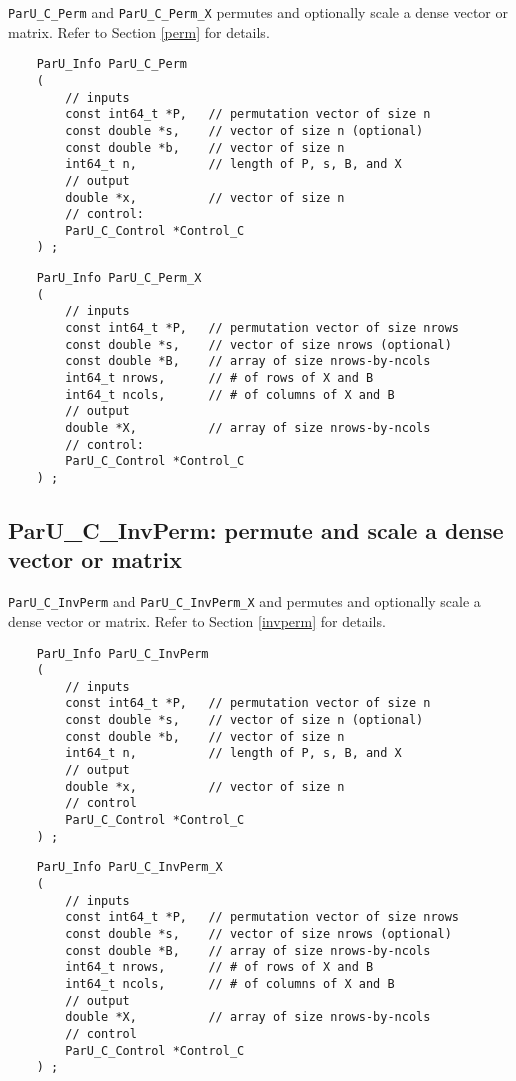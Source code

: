 \documentclass[12pt]{article}
\begin{document}
    \verb'ParU_C_Perm' and \verb'ParU_C_Perm_X' permutes and optionally scale a
    dense vector or matrix.  Refer to Section \ref{perm} for details.

    {\footnotesize
    \begin{verbatim}
    ParU_Info ParU_C_Perm
    (
        // inputs
        const int64_t *P,   // permutation vector of size n
        const double *s,    // vector of size n (optional)
        const double *b,    // vector of size n
        int64_t n,          // length of P, s, B, and X
        // output
        double *x,          // vector of size n
        // control:
        ParU_C_Control *Control_C
    ) ; \end{verbatim} }

    {\footnotesize
    \begin{verbatim}
    ParU_Info ParU_C_Perm_X
    (
        // inputs
        const int64_t *P,   // permutation vector of size nrows
        const double *s,    // vector of size nrows (optional)
        const double *B,    // array of size nrows-by-ncols
        int64_t nrows,      // # of rows of X and B
        int64_t ncols,      // # of columns of X and B
        // output
        double *X,          // array of size nrows-by-ncols
        // control:
        ParU_C_Control *Control_C
    ) ; \end{verbatim} }

\subsection{{\sf ParU\_C\_InvPerm}: permute and scale a dense vector or matrix}

    \verb'ParU_C_InvPerm' and \verb'ParU_C_InvPerm_X' and permutes and
    optionally scale a dense vector or matrix.  Refer to Section \ref{invperm} for
    details.

    {\footnotesize
    \begin{verbatim}
    ParU_Info ParU_C_InvPerm
    (
        // inputs
        const int64_t *P,   // permutation vector of size n
        const double *s,    // vector of size n (optional)
        const double *b,    // vector of size n
        int64_t n,          // length of P, s, B, and X
        // output
        double *x,          // vector of size n
        // control
        ParU_C_Control *Control_C
    ) ; \end{verbatim} }

    {\footnotesize
    \begin{verbatim}
    ParU_Info ParU_C_InvPerm_X
    (
        // inputs
        const int64_t *P,   // permutation vector of size nrows
        const double *s,    // vector of size nrows (optional)
        const double *B,    // array of size nrows-by-ncols
        int64_t nrows,      // # of rows of X and B
        int64_t ncols,      // # of columns of X and B
        // output
        double *X,          // array of size nrows-by-ncols
        // control
        ParU_C_Control *Control_C
    ) ; \end{verbatim} }
\end{document}
